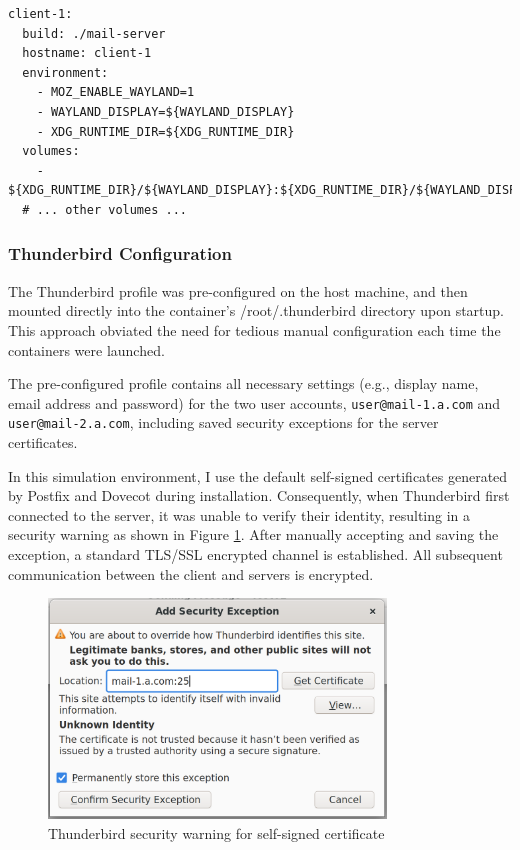 \begin{lstlisting}[caption={docker-compose.yml: GUI forwarding for client-1}]
client-1:
  build: ./mail-server
  hostname: client-1
  environment:
    - MOZ_ENABLE_WAYLAND=1
    - WAYLAND_DISPLAY=${WAYLAND_DISPLAY}
    - XDG_RUNTIME_DIR=${XDG_RUNTIME_DIR}
  volumes:
    - ${XDG_RUNTIME_DIR}/${WAYLAND_DISPLAY}:${XDG_RUNTIME_DIR}/${WAYLAND_DISPLAY}:ro
  # ... other volumes ...
\end{lstlisting}

\subsubsection*{Thunderbird Configuration}
The Thunderbird profile was pre-configured on the host machine, and then mounted directly into the container's /root/.thunderbird directory upon startup. This approach obviated the need for tedious manual configuration each time the containers were launched.

The pre-configured profile contains all necessary settings (e.g., display name, email address and password) for the two user accounts, \texttt{user@mail-1.a.com} and \texttt{user@mail-2.a.com}, including saved security exceptions for the server certificates.

In this simulation environment, I use the default self-signed certificates generated by Postfix and Dovecot during installation. Consequently, when Thunderbird first connected to the server, it was unable to verify their identity, resulting in a security warning as shown in Figure \ref{fig:security_warning}. After manually accepting and saving the exception, a standard TLS/SSL encrypted channel is established. All subsequent communication between the client and servers is encrypted.
\begin{figure}[ht]
      \centering
      \includegraphics[width=0.8\textwidth]{Implementation/security_warning.png}
      \caption{Thunderbird security warning for self-signed certificate}
      \label{fig:security_warning}
\end{figure}

